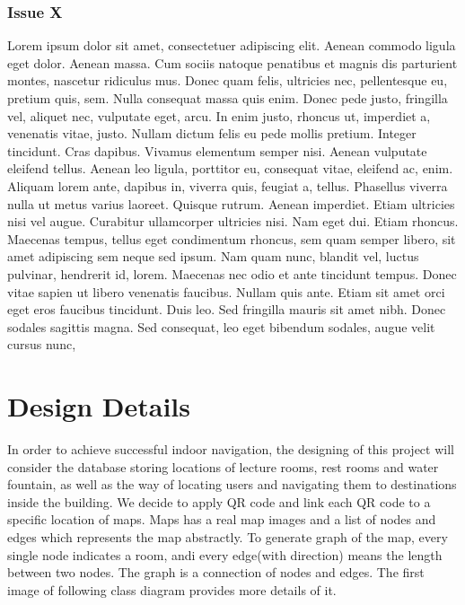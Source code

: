 \documentclass[12pt]{article}
\begin{document}
\subsubsection{Issue X}
Lorem ipsum dolor sit amet, consectetuer adipiscing elit. Aenean commodo ligula eget dolor. Aenean massa. Cum sociis natoque penatibus et magnis dis parturient montes, nascetur ridiculus mus. Donec quam felis, ultricies nec, pellentesque eu, pretium quis, sem. Nulla consequat massa quis enim. Donec pede justo, fringilla vel, aliquet nec, vulputate eget, arcu. In enim justo, rhoncus ut, imperdiet a, venenatis vitae, justo. Nullam dictum felis eu pede mollis pretium. Integer tincidunt. Cras dapibus. Vivamus elementum semper nisi. Aenean vulputate eleifend tellus. Aenean leo ligula, porttitor eu, consequat vitae, eleifend ac, enim. Aliquam lorem ante, dapibus in, viverra quis, feugiat a, tellus. Phasellus viverra nulla ut metus varius laoreet. Quisque rutrum. Aenean imperdiet. Etiam ultricies nisi vel augue. Curabitur ullamcorper ultricies nisi. Nam eget dui. Etiam rhoncus. Maecenas tempus, tellus eget condimentum rhoncus, sem quam semper libero, sit amet adipiscing sem neque sed ipsum. Nam quam nunc, blandit vel, luctus pulvinar, hendrerit id, lorem. Maecenas nec odio et ante tincidunt tempus. Donec vitae sapien ut libero venenatis faucibus. Nullam quis ante. Etiam sit amet orci eget eros faucibus tincidunt. Duis leo. Sed fringilla mauris sit amet nibh. Donec sodales sagittis magna. Sed consequat, leo eget bibendum sodales, augue velit cursus nunc,



\section{Design Details}
In order to achieve successful indoor navigation, the designing of this project will consider the database storing locations of lecture rooms, rest rooms and water fountain, as well as the way of locating users and navigating them to destinations inside the building.  
We decide to apply QR code and link each QR code to a specific location of maps. Maps has a real map images and a list of nodes and edges which represents the map abstractly.  To generate graph of the map, every single node indicates a room, andi every edge(with direction) means the length between two nodes. The graph is a connection of nodes and edges.  The first image of following class diagram provides more details of it.
	
\end{document}

